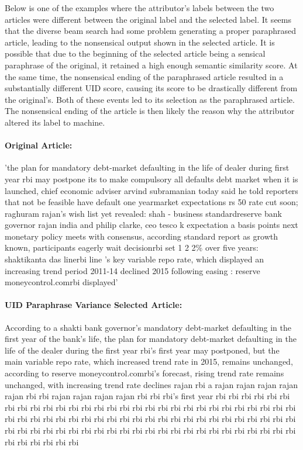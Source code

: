 \documentclass{article}
\begin{document}
Below is one of the examples where the attributor's labels between the two articles were different between the original label and the selected label. It seems that the diverse beam search had some problem generating a proper paraphrased article, leading to the nonsensical output shown in the selected article. It is possible that due to the beginning of the selected article being a sensical paraphrase of the original, it retained a high enough semantic similarity score. At the same time, the nonsensical ending of the paraphrased article resulted in a substantially different UID score, causing its score to be drastically different from the original's. Both of these events led to its selection as the paraphrased article. The nonsensical ending of the article is then likely the reason why the attributor altered its label to machine.

\paragraph{Original Article:}'the plan for mandatory debt-market defaulting in the life of dealer during first year rbi may postpone its to make compulsory all defaults debt market when it is launched, chief economic adviser arvind subramanian today said he told reporters that not be feasible have default one yearmarket expectations rs 50 rate cut soon; raghuram rajan's wish list yet revealed: shah - business standardreserve bank governor rajan india and philip clarke, ceo tesco k expectation a basis points next monetary policy meets with consensus, according standard report as growth known, participants eagerly wait decisionrbi set 1 2 2\% over five years: shaktikanta das linerbi line 's key variable repo rate, which displayed an increasing trend period 2011-14 declined 2015 following easing : reserve moneycontrol.comrbi displayed'

 \paragraph{UID Paraphrase Variance Selected Article:}According to a shakti bank governor's mandatory debt-market defaulting in the first year of the bank's life, the plan for mandatory debt-market defaulting in the life of the dealer during the first year rbi's first year may postponed, but the main variable repo rate, which increased trend rate in 2015, remains unchanged, according to reserve moneycontrol.comrbi's forecast, rising trend rate remains unchanged, with increasing trend rate declines \color{red} rajan rbi a rajan rajan rajan rajan rajan rbi rbi rajan rajan rajan rajan rbi rbi rbi's first year rbi rbi rbi rbi rbi rbi rbi rbi rbi rbi rbi rbi rbi rbi rbi rbi rbi rbi rbi rbi rbi rbi rbi rbi rbi rbi rbi rbi rbi rbi rbi rbi rbi rbi rbi rbi rbi rbi rbi rbi rbi rbi rbi rbi rbi rbi rbi rbi rbi rbi rbi rbi rbi rbi rbi rbi rbi rbi rbi rbi rbi rbi rbi rbi rbi rbi rbi rbi rbi rbi rbi rbi rbi rbi rbi rbi rbi rbi rbi rbi rbi \color{black}
\end{document}
